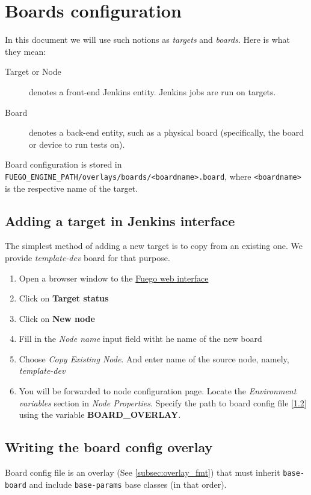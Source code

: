 \section{Boards configuration}
In this document we will use such notions as \textit{targets} and \textit{boards}. Here is what they mean:
\begin{description}
\item[Target or Node] denotes a front-end Jenkins entity. Jenkins jobs are run on targets.
\item[Board] denotes a back-end entity, such as a physical board (specifically, the board or device to run tests on).
\end{description}

Board configuration is stored in \texttt{FUEGO\_ENGINE\_PATH/overlays/boards/<boardname>.board}, 
where \texttt{<boardname>} is the respective name of the target.

\subsection{Adding a target in Jenkins interface}
\label{sec:target-add}
The simplest method of adding a new target is to copy from an existing one. 
We provide \textit{template-dev} board for that purpose.
\begin{enumerate}
\item Open a browser window to the \href{http://localhost:8080/}{Fuego web interface}
\item Click on \textbf{Target status}
\item Click on \textbf{New node}
\item Fill in the \textit{Node name} input field witht he name of the new board
\item Choose \textit{Copy Existing Node}. And enter name of the source node, namely, \textit{template-dev}
\item You will be forwarded to node configuration page.
Locate the \textit{Environment variables} section in \textit{Node Properties}.
Specify the path to board config file [\ref{sec:board_config}] using the variable \textbf{BOARD\_OVERLAY}.
\end{enumerate}

\subsection{Writing the board config overlay}
\label{sec:board_config}
Board config file is an overlay (See \ref{subsec:overlay_fmt}) that must inherit \texttt{base-board} and include \texttt{base-params} base classes (in that order).

